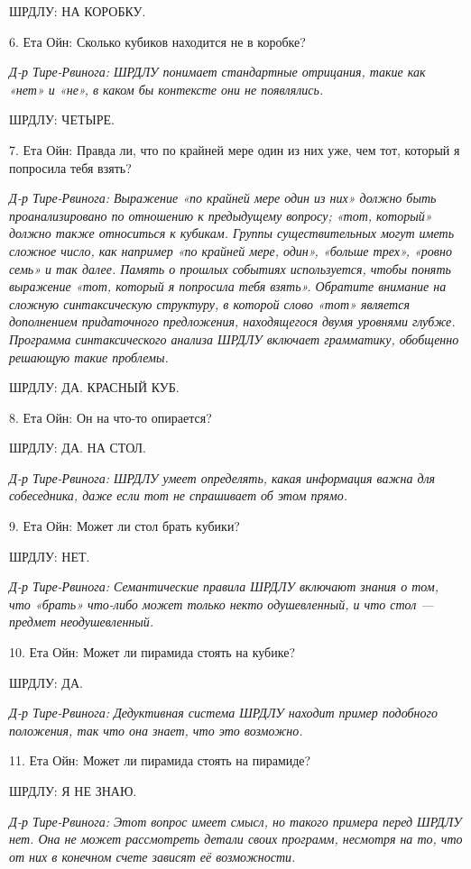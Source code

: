 \documentclass[../main.tex]{subfiles}
\begin{document}
\begin{dialogue}
ШРДЛУ: НА КОРОБКУ.

6. Ета Ойн: Сколько кубиков находится не в коробке?

\emph{Д-р Тире-Рвинога: ШРДЛУ понимает стандартные отрицания, такие как «нет» и «не», в каком бы контексте они не появлялись.}

ШРДЛУ: ЧЕТЫРЕ.

7. Ета Ойн: Правда ли, что по крайней мере один из них уже, чем тот, который я попросила тебя взять?

\emph{Д-р Тире-Рвинога: Выражение «по крайней мере один из них» должно быть проанализировано по отношению к предыдущему вопросу; «тот, который» должно также относиться к кубикам. Группы существительных могут иметь сложное число, как например «по крайней мере, один», «больше трех», «ровно семь» и так далее. Память о прошлых событиях используется, чтобы понять выражение «тот, который я попросила тебя взять». Обратите внимание на сложную синтаксическую структуру, в которой слово «тот» является дополнением придаточного предложения, находящегося двумя уровнями глубже. Программа синтаксического анализа ШРДЛУ включает грамматику, обобщенно решающую такие проблемы.}

ШРДЛУ: ДА. КРАСНЫЙ КУБ.

8. Ета Ойн: Он на что-то опирается?

ШРДЛУ: ДА. НА СТОЛ.

\emph{Д-р Тире-Рвинога: ШРДЛУ умеет определять, какая информация важна для собеседника, даже если тот не спрашивает об этом прямо.}

9. Ета Ойн: Может ли стол брать кубики?

ШРДЛУ: НЕТ.

\emph{Д-р Тире-Рвинога: Семантические правила ШРДЛУ включают знания о том, что «брать» что-либо может только некто одушевленный, и что стол --- предмет неодушевленный.}

10. Ета Ойн: Может ли пирамида стоять на кубике?

ШРДЛУ: ДА.

\emph{Д-р Тире-Рвинога: Дедуктивная система ШРДЛУ находит пример подобного положения, так что она знает, что это возможно.}

11. Ета Ойн: Может ли пирамида стоять на пирамиде?

ШРДЛУ: Я НЕ ЗНАЮ.

\emph{Д-р Тире-Рвинога: Этот вопрос имеет смысл, но такого примера перед ШРДЛУ нет. Она не может рассмотреть детали своих программ, несмотря на то, что от них в конечном счете зависят её возможности.}


\end{dialogue}
\end{document}
